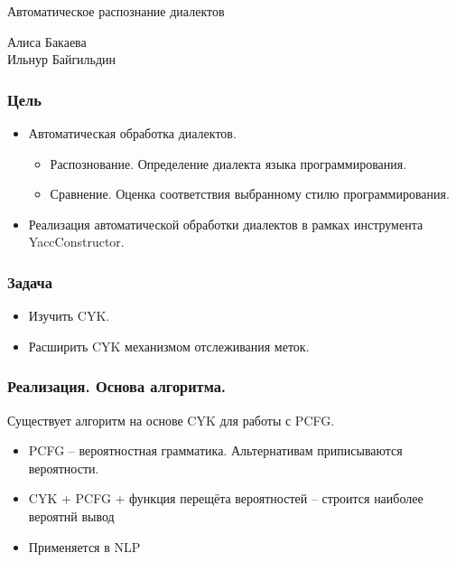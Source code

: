 \documentclass{beamer}
\begin{document}

\author[Алиса Бакаева]{}

\begin{frame}
	\transwipe[direction=90]
	\begin{block}{}
	    \begin{center}
	        \huge{Автоматическое распознание диалектов}
	    \end{center}
	\end{block}
	\begin{center}
	    \huge
	        {Алиса Бакаева
	        \\
            Ильнур Байгильдин}
	\end{center}
\end{frame}    

\begin{frame}
\frametitle{Цель}
    \begin{itemize}
        \item Автоматическая обработка диалектов.
            \begin{itemize}
                \item Распознование. Определение диалекта языка программирования.
                \item Сравнение. Оценка соответствия выбранному стилю программирования.
            \end{itemize}
        \item Реализация автоматической обработки диалектов в рамках инструмента YaccConstructor.
    \end{itemize}
\end{frame}

\begin{frame}
	\transwipe[direction=90]
	\frametitle{Задача}
	\begin{itemize}
        \item Изучить CYK.
        \item Расширить CYK механизмом отслеживания меток.
    \end{itemize}
\end{frame}

\begin{frame}
	\transwipe[direction=90]
	\frametitle{Реализация. Основа алгоритма.}
	Существует алгоритм на основе CYK для работы с PCFG.
	\begin{itemize}
        \item PCFG -- вероятностная грамматика. Альтернативам приписываются вероятности. 
        \item CYK + PCFG + функция перещёта вероятностей -- строится наиболее вероятнй вывод
        \item Применяется в NLP
    \end{itemize}
\end{frame}    
\end{document}
